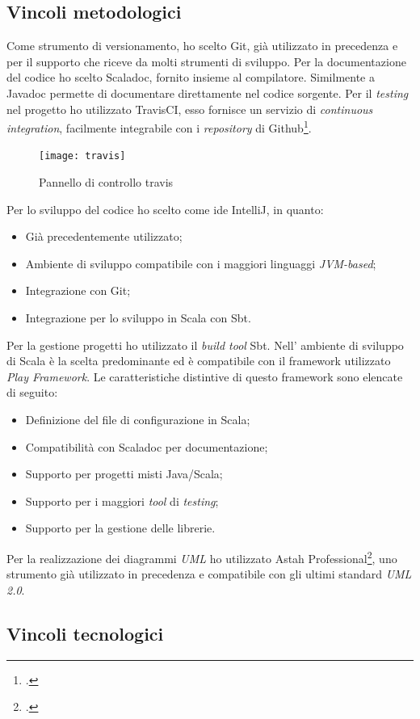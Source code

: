 \subsection{Vincoli metodologici}
Come strumento di versionamento, ho scelto Git, già utilizzato in precedenza e per il supporto che riceve da molti strumenti di sviluppo. Per la documentazione del codice ho scelto Scaladoc, fornito insieme al compilatore. Similmente a Javadoc permette di documentare direttamente nel codice sorgente. Per il \emph{testing} nel progetto ho utilizzato TravisCI, esso fornisce un servizio di \emph{continuous integration}, facilmente integrabile con i \emph{repository} di Github\footcite{https://github.com/}.
\begin{figure}[ht]
\centering
\texttt{[image: travis]}
\caption{Pannello di controllo travis}
\end{figure}
\newpage
Per lo sviluppo del codice ho scelto come \gls{ide} IntelliJ, in quanto:
\begin{itemize}
\item Già precedentemente utilizzato;
\item Ambiente di sviluppo compatibile con i maggiori linguaggi \emph{JVM-based};
\item Integrazione con Git;
\item Integrazione per lo sviluppo in Scala con Sbt.
\end{itemize}
Per la gestione progetti ho utilizzato il \emph{build tool} Sbt. Nell' ambiente di sviluppo di Scala è la scelta predominante ed è compatibile con il \gls{framework} utilizzato \emph{Play Framework}. Le caratteristiche distintive di questo \gls{framework} sono elencate di seguito:
\begin{itemize}
\item Definizione del file di configurazione in Scala;
\item Compatibilità con Scaladoc per documentazione;
\item Supporto per progetti misti Java/Scala;
\item Supporto per i maggiori \emph{tool} di \emph{testing};
\item Supporto per la gestione delle librerie.
\end{itemize}
Per la realizzazione dei diagrammi \emph{UML} ho utilizzato Astah Professional\footcite{http://astah.net/}, uno strumento già utilizzato in precedenza e compatibile con gli ultimi standard \emph{UML 2.0}.
\subsection{Vincoli tecnologici}
